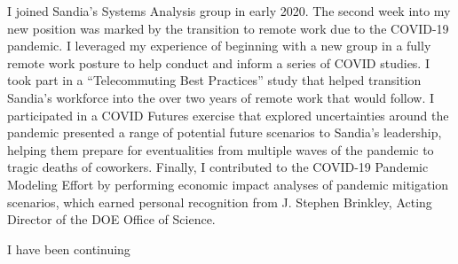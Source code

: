 \documentclass[11pt]{article}
\begin{document}
I joined Sandia's Systems Analysis group in early 2020. The second week into my new position was marked by the transition to remote work due to the COVID-19 pandemic. I leveraged my experience of beginning with a new group in a fully remote work posture to help conduct and inform a series of COVID studies. I took part in a ``Telecommuting Best Practices'' study that helped transition Sandia's workforce into the over two years of remote work that would follow. I participated in a COVID Futures exercise that explored uncertainties around the pandemic presented a range of potential future scenarios to Sandia's leadership, helping them prepare for eventualities from multiple waves of the pandemic to tragic deaths of coworkers. Finally, I contributed to the COVID-19 Pandemic Modeling Effort by performing economic impact analyses of pandemic mitigation scenarios, which earned personal recognition from J. Stephen Brinkley, Acting Director of the DOE Office of Science.

I have been continuing 
\end{document}
